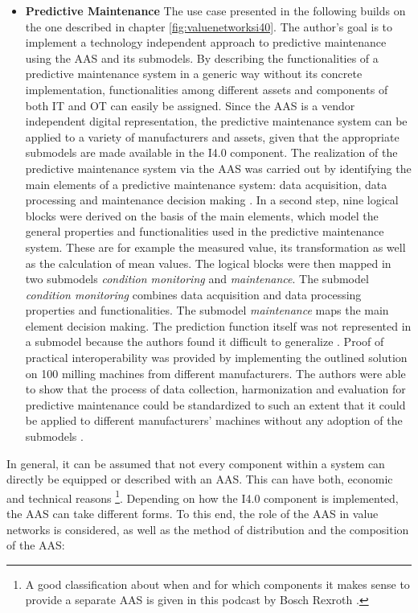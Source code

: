 \begin{itemize}
    \item [] \textbf{Predictive Maintenance} The use case presented in the following builds on the one described in chapter \ref{fig:valuenetworksi40}. The author's goal is to implement a technology independent approach to predictive maintenance using the \ac{AAS} and its submodels. By describing the functionalities of a predictive maintenance system in a generic way without its concrete implementation, functionalities among different assets and components of both IT and OT can easily be assigned. Since the  \ac{AAS} is a vendor independent digital representation, the predictive maintenance system can be applied to a variety of manufacturers and assets, given that the appropriate submodels are made available in the \ac{I4.0} component. The realization of the predictive maintenance system via the \ac{AAS} was carried out by identifying the main elements of a predictive maintenance system: data acquisition, data processing and maintenance decision making \cite[p. 4]{Cavalieri2020AShell}. In a second step, nine logical blocks were derived on the basis of the main elements, which model the general properties and functionalities used in the  predictive maintenance system. These are for example the measured value, its transformation as well as the calculation of mean values. The logical blocks were then mapped in two submodels \textit{condition monitoring} and \textit{maintenance}. The submodel \textit{condition monitoring} combines data acquisition and data processing properties and functionalities. The submodel \textit{maintenance} maps the main element decision making. The prediction function itself was not represented in a submodel because the authors found it  difficult to generalize \cite[p. 10]{Cavalieri2020AShell}. Proof of practical interoperability was provided by implementing the outlined solution on 100 milling machines from different manufacturers. The authors were able to show that the process of data collection, harmonization and evaluation for predictive maintenance could be standardized to such an extent that it could be applied to different manufacturers' machines without any adoption of the submodels  \cite[p. 17]{Cavalieri2020AShell}.  
\end{itemize}

In general, it can be assumed that not every component within a system can directly be equipped or described with an \ac{AAS}. This can have both, economic and technical reasons \footnote{A good classification about when and for which components it makes sense to provide a separate \ac{AAS} is given in this podcast by Bosch Rexroth \cite{Noll2021WasRexroth}.}. Depending on how the \ac{I4.0} component is implemented, the \ac{AAS} can take different forms. To this end, the role of the \ac{AAS} in value networks is considered, as well as the method of distribution and the composition of the \ac{AAS}:

